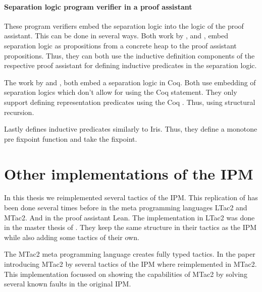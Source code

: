 \documentclass[thesis.tex]{subfiles}
\begin{document}
\paragraph{Separation logic program verifier in a proof assistant}
These program verifiers embed the separation logic into the logic of the proof assistant. This can be done in several ways. Both work by  \cite{appelTacticsSeparationLogic}, and  \cite{rouvoetIntrinsicallyTypedCompilation2021}, embed separation logic as propositions from a concrete heap to the proof assistant propositions. Thus, they can both use the inductive definition components of the respective proof assistant for defining inductive predicates in the separation logic.

The work by  \cite{chlipalaMostlyautomatedVerificationLowlevel2011} and  \cite{bengtsonCharge2012}, both embed a separation logic in Coq. Both use embedding of separation logics which don't allow for using the Coq  statement. They only support defining representation predicates using the Coq . Thus, using structural recursion.

Lastly  \cite{appelProgramLogicsCertified2014} defines inductive predicates similarly to Iris. Thus, they define a monotone pre fixpoint function and take the fixpoint.

\section{Other implementations of the IPM}
In this thesis we reimplemented several tactics of the IPM. This replication of \cite{krebbersInteractiveProofsHigherorder2017} has been done several times before in the meta programming languages LTac2 and MTac2. And in the proof assistant Lean. The implementation in LTac2 was done in the master thesis of  \cite{liesnikovExtendingAutomatingIris2020}. They keep the same structure in their tactics as the IPM while also adding some tactics of their own.

The MTac2 meta programming language creates fully typed tactics. In the paper introducing MTac2 by  \cite{kaiserMtac2TypedTactics2018} several tactics of the IPM where reimplemented in MTac2. This implementation focussed on showing the capabilities of MTac2 by solving several known faults in the original IPM.
\end{document}
